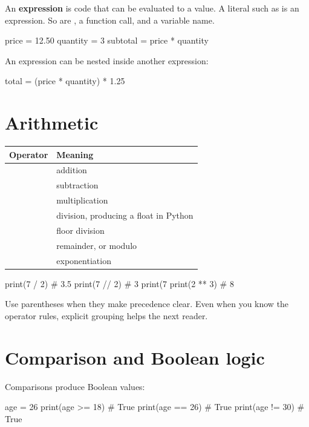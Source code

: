 \documentclass[11pt,openany,oneside]{book}
\newcommand{\inlinecode}[1]{\texttt{\small\detokenize{#1}}}
\newcommand{\term}[1]{\textbf{#1}\index{#1}}
\begin{document}
An \term{expression} is code that can be evaluated to a value. A literal such as \inlinecode{7} is an expression. So are \inlinecode{2 + 3}, a function call, and a variable name.

\begin{code}[language=Python]
price = 12.50
quantity = 3
subtotal = price * quantity
\end{code}

An expression can be nested inside another expression:

\begin{code}[language=Python]
total = (price * quantity) * 1.25
\end{code}

\section{Arithmetic}

\begin{tabularx}{\textwidth}{>{\ttfamily}p{} X}
\toprule
Operator & Meaning \\
\midrule
\inlinecode{+} & addition \\
\inlinecode{-} & subtraction \\
\inlinecode{*} & multiplication \\
\inlinecode{/} & division, producing a float in Python \\
\inlinecode{//} & floor division \\
\inlinecode{\%} & remainder, or modulo \\
\inlinecode{**} & exponentiation \\
\bottomrule
\end{tabularx}

\begin{code}[language=Python]
print(7 / 2)     # 3.5
print(7 // 2)    # 3
print(7 %
print(2 ** 3)    # 8
\end{code}

Use parentheses when they make precedence clear. Even when you know the operator rules, explicit grouping helps the next reader.

\section{Comparison and Boolean logic}

Comparisons produce Boolean values:

\begin{code}[language=Python]
age = 26
print(age >= 18)       # True
print(age == 26)       # True
print(age != 30)       # True
\end{code}
\end{document}
